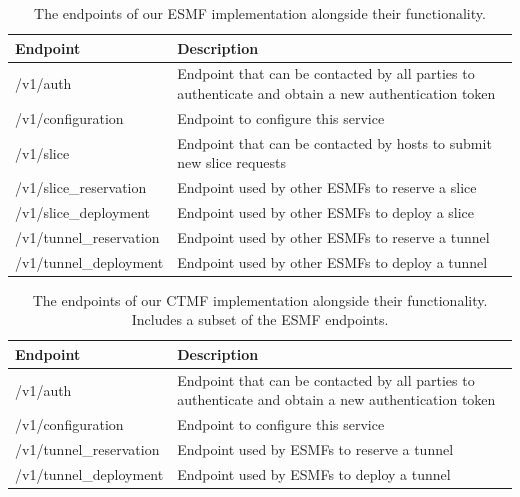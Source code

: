\begin{table}[htp]
    \begin{tabularx}{\textwidth}{ |l|X| }
        \hline
        \textbf{Endpoint} & \textbf{Description} \\
        \hline
         /v1/auth & Endpoint that can be contacted by all parties to authenticate and obtain a new authentication token \\
         /v1/configuration & Endpoint to configure this service \\
        \hline
         /v1/slice & Endpoint that can be contacted by hosts to submit new slice requests \\
        \hline
         /v1/slice\_reservation & Endpoint used by other ESMFs to reserve a slice \\
         /v1/slice\_deployment & Endpoint used by other ESMFs to deploy a slice \\
         /v1/tunnel\_reservation & Endpoint used by other ESMFs to reserve a tunnel  \\
         /v1/tunnel\_deployment & Endpoint used by other ESMFs to deploy a tunnel \\
        \hline
    \end{tabularx}
    \caption[ESMF endpoints]{The endpoints of our ESMF implementation alongside their functionality.}
    \label{table:esmf}
\end{table}

\begin{table}[htp]
    \begin{tabularx}{\textwidth}{ |l|X| }
        \hline
        \textbf{Endpoint} & \textbf{Description} \\
        \hline
         /v1/auth & Endpoint that can be contacted by all parties to authenticate and obtain a new authentication token \\
         /v1/configuration & Endpoint to configure this service \\
        \hline
         /v1/tunnel\_reservation & Endpoint used by ESMFs to reserve a tunnel  \\
         /v1/tunnel\_deployment & Endpoint used by ESMFs to deploy a tunnel \\
        \hline
    \end{tabularx}
    \caption[CTMF endpoints]{The endpoints of our CTMF implementation alongside their functionality. Includes a subset of the ESMF endpoints.}
    \label{table:ctmf}
\end{table}

